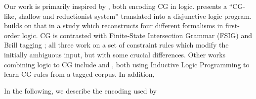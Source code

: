 


Our work is primarily inspired by \cite{lager98, lager_nivre01}, both encoding CG in logic.
\cite{lager98} presents a ``CG-like, shallow and reductionist system'' translated into a disjunctive logic program.
\cite{lager_nivre01} builds on that in a study which reconstructs
four different formalisms in first-order logic. 
CG is contrasted with Finite-State Intersection Grammar (FSIG) \cite{koskenniemi90} 
and Brill tagging ; all three work on a set of constraint rules 
which modify the initially ambiguous input, but with some crucial differences.
%
Other works combining logic to CG include
\cite{lindberg_eineborg98ilp} and \cite{asfrent14}, both using Inductive Logic Programming to learn CG rules from a tagged corpus.
In addition, \cite{lager01transformation} 



In the following, we describe the encoding used by 





